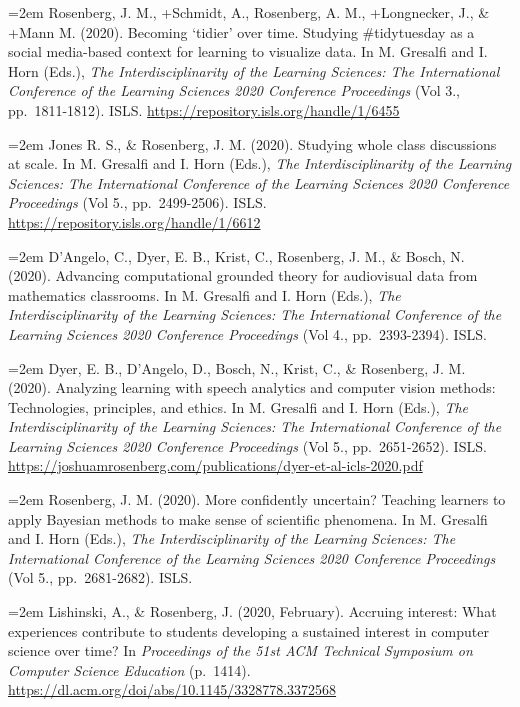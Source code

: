 \documentclass[
  14,
]{article}
\begin{document}
\hangindent=2em Rosenberg, J. M., +Schmidt, A., Rosenberg, A. M.,
+Longnecker, J., \& +Mann M. (2020). Becoming `tidier' over time.
Studying \#tidytuesday as a social media-based context for learning to
visualize data. In M. Gresalfi and I. Horn (Eds.), \emph{The
Interdisciplinarity of the Learning Sciences: The International
Conference of the Learning Sciences 2020 Conference Proceedings} (Vol
3., pp.~1811-1812). ISLS.
\url{https://repository.isls.org/handle/1/6455}

\hangindent=2em Jones R. S., \& Rosenberg, J. M. (2020). Studying whole
class discussions at scale. In M. Gresalfi and I. Horn (Eds.), \emph{The
Interdisciplinarity of the Learning Sciences: The International
Conference of the Learning Sciences 2020 Conference Proceedings} (Vol
5., pp.~2499-2506). ISLS.
\url{https://repository.isls.org/handle/1/6612}

\hangindent=2em D'Angelo, C., Dyer, E. B., Krist, C., Rosenberg, J. M.,
\& Bosch, N. (2020). Advancing computational grounded theory for
audiovisual data from mathematics classrooms. In M. Gresalfi and I. Horn
(Eds.), \emph{The Interdisciplinarity of the Learning Sciences: The
International Conference of the Learning Sciences 2020 Conference
Proceedings} (Vol 4., pp.~2393-2394). ISLS.

\hangindent=2em Dyer, E. B., D'Angelo, D., Bosch, N., Krist, C., \&
Rosenberg, J. M. (2020). Analyzing learning with speech analytics and
computer vision methods: Technologies, principles, and ethics. In M.
Gresalfi and I. Horn (Eds.), \emph{The Interdisciplinarity of the
Learning Sciences: The International Conference of the Learning Sciences
2020 Conference Proceedings} (Vol 5., pp.~2651-2652). ISLS.
\url{https://joshuamrosenberg.com/publications/dyer-et-al-icls-2020.pdf}

\hangindent=2em Rosenberg, J. M. (2020). More confidently uncertain?
Teaching learners to apply Bayesian methods to make sense of scientific
phenomena. In M. Gresalfi and I. Horn (Eds.), \emph{The
Interdisciplinarity of the Learning Sciences: The International
Conference of the Learning Sciences 2020 Conference Proceedings} (Vol
5., pp.~2681-2682). ISLS.

\hangindent=2em Lishinski, A., \& Rosenberg, J. (2020, February).
Accruing interest: What experiences contribute to students developing a
sustained interest in computer science over time? In \emph{Proceedings
of the 51st ACM Technical Symposium on Computer Science Education}
(p.~1414). \url{https://dl.acm.org/doi/abs/10.1145/3328778.3372568}
\end{document}
